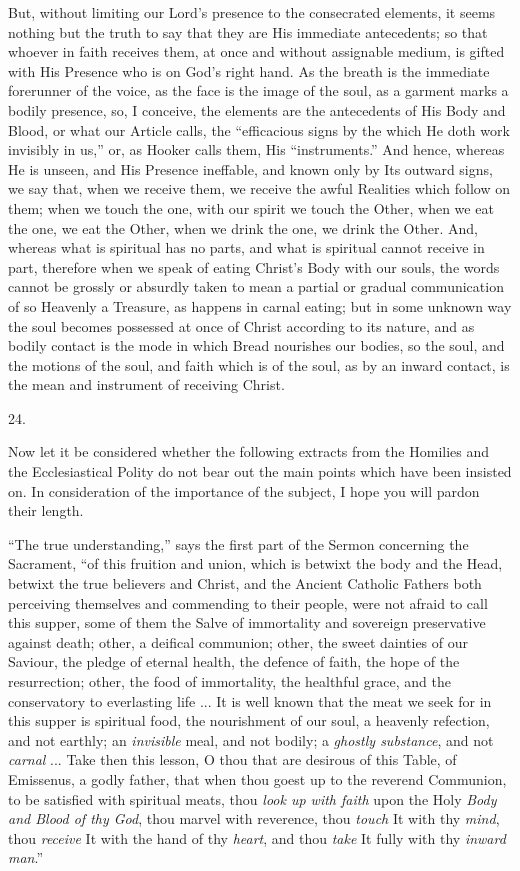 But, without limiting our Lord's presence to the
consecrated elements, it seems nothing but the truth to say that they
are His immediate antecedents; so that whoever in faith receives them,
at once and without assignable medium, is gifted with His Presence who
is on God's right hand. As the breath is the immediate forerunner of
the voice, as the face is the image of the soul, as a garment
marks a bodily presence, so, I conceive, the elements are the
antecedents of His Body and Blood, or what our Article calls, the ``efficacious
signs by the which He doth work invisibly in us,'' or, as Hooker calls
them, His ``instruments.'' And hence, whereas He is unseen, and His
Presence ineffable, and known only by Its outward signs, we say that,
when we receive them, we receive the awful Realities which follow on
them; when we touch the one, with our spirit we touch the Other, when
we eat the one, we eat the Other, when we drink the one, we drink the
Other. And, whereas what is spiritual has no parts, and what is
spiritual cannot receive in part, therefore when we speak of eating
Christ's Body with our souls, the words cannot be grossly or absurdly
taken to mean a partial or gradual communication of so Heavenly a
Treasure, as happens in carnal eating; but in some unknown way the
soul becomes possessed at once of Christ according to its nature, and
as bodily contact is the mode in which Bread nourishes our bodies, so
the soul, and the motions of the soul, and faith which is of the soul,
as by an inward contact, is the mean and instrument of receiving
Christ.

24.

Now let it be considered whether the following
extracts from the Homilies and the Ecclesiastical Polity do not bear
out the main points which have been insisted on. In consideration of
the importance of the subject, I hope you will pardon their length.

``The true understanding,'' says the first part of
the Sermon concerning the Sacrament, ``of this fruition and union,
which is betwixt the body and the Head, betwixt the true believers and
Christ, and the Ancient Catholic Fathers both perceiving themselves
and commending to their people, were not afraid to call this supper,
some of them the Salve of immortality and sovereign preservative
against death; other, a deifical communion; other, the sweet dainties
of our Saviour, the pledge of eternal health, the defence of faith,
the hope of the resurrection; other, the food of immortality, the
healthful grace, and the conservatory to everlasting life ... It is
well known that the meat we seek for in this supper is spiritual food,
the nourishment of our soul, a heavenly refection, and not earthly; an
\emph{invisible} meal, and not bodily; a \emph{ghostly substance}, and
not \emph{carnal} ... Take then this lesson, O thou that are desirous
of this Table, of Emissenus, a godly father, that when thou goest up
to the reverend Communion, to be satisfied with spiritual meats, thou \emph{look
up with faith} upon the Holy \emph{Body and Blood of thy God}, thou
marvel with reverence, thou \emph{touch} It with thy \emph{mind}, thou
\emph{receive} It with the hand of thy \emph{heart}, and thou \emph{take}
It fully with thy \emph{inward man}.''

